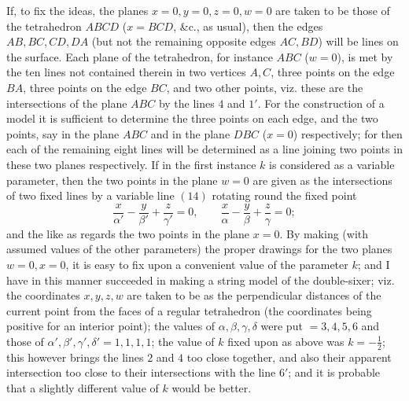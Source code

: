 \documentclass[11pt,a4paper]{article}
\begin{document}
If, to fix the ideas, the planes $x=0,y=0,z=0,w=0$ are taken to be those of the
tetrahedron $ABCD$ ($x=BCD$, \&c., as usual), then the edges $AB,BC,CD,DA$
(but not the remaining opposite edges $AC,BD$) will be lines on the surface. Each
plane of the tetrahedron, for instance $ABC$ ($w=0$), is met by the ten lines not
contained therein in two vertices $A,C$, three points on the edge $BA$, three points
on the edge $BC$, and two other points, viz. these are the intersections of the plane
$ABC$ by the lines $4$ and $1'$. For the construction of a model it is sufficient to
determine the three points on each edge, and the two points, say in the plane $ABC$
and in the plane $DBC$ ($x=0$) respectively; for then each of the remaining eight
lines will be determined as a line joining two points in these two planes respectively.
If in the first instance $k$ is considered as a variable parameter, then the two points
in the plane $w=0$ are given as the intersections of two fixed lines by a variable line
$(14)$ rotating round the fixed point
\[
\frac{x}{\alpha'}-\frac{y}{\beta'}+\frac{z}{\gamma'}=0,\qquad
\frac{x}{\alpha}-\frac{y}{\beta}+\frac{z}{\gamma}=0;
\]
and the like as regards the two points in the plane $x=0$. By making (with assumed
values of the other parameters) the proper drawings for the two planes $w=0,x=0$, it
is easy to fix upon a convenient value of the parameter $k$; and I have in this manner
succeeded in making a string model of the double-sixer; viz. the coordinates
$x,y,z,w$ are taken to be as the perpendicular distances of the current point from the
faces of a regular tetrahedron (the coordinates being positive for an interior point);
the values of $\alpha,\beta,\gamma,\delta$ were put $=3,4,5,6$ and those of
$\alpha',\beta',\gamma',\delta'=1,1,1,1$; the value of $k$ fixed upon as above was
$k=-\frac12$; this however brings the lines $2$ and $4$ too close together, and also
their apparent intersection too close to their intersections with the line $6'$; and it
is probable that a slightly different value of $k$ would be better.
\end{document}
